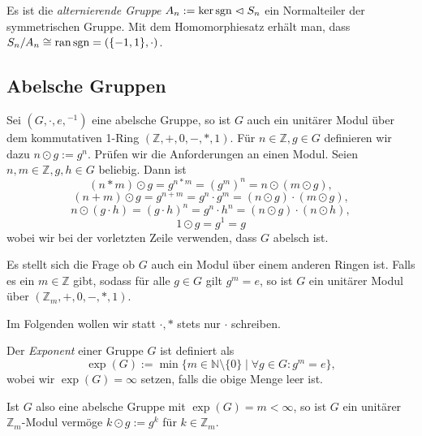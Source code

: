 \begin{remark}
    Es ist die \emph{alternierende Gruppe} $A_n := \ker \operatorname{sgn} \vartriangleleft S_n$ ein Normalteiler der symmetrischen Gruppe. Mit dem Homomorphiesatz erhält man, dass $S_n/A_n \cong \operatorname{ran} \operatorname{sgn} = (\{-1,1\}, \cdot)$.
\end{remark}


\subsection{Abelsche Gruppen}

\begin{remark}
    Sei $(G, \cdot, e, {}^{-1})$ eine abelsche Gruppe, so ist $G$ auch ein unitärer Modul über dem kommutativen 1-Ring $(\mathbb{Z}, +, 0, -, \ast, 1)$. Für $n \in \mathbb{Z}, g \in G$ definieren wir dazu $n \odot g := g^n$. Prüfen wir die Anforderungen an einen Modul. Seien $n, m \in \mathbb{Z}, g, h \in G$ beliebig. Dann ist
    $$ (n \ast m) \odot g = g^{n \ast m} = (g^m)^n = n \odot (m \odot g), $$
    $$ (n+m) \odot g = g^{n+m} = g^n \cdot g^m = (n \odot g) \cdot (m \odot g), $$
    $$ n \odot (g \cdot h) = (g \cdot h)^n = g^n \cdot h^n = (n \odot g) \cdot (n \odot h), $$
    $$1\odot g=g^1=g$$
    wobei wir bei der vorletzten Zeile verwenden, dass $G$ abelsch ist.

    Es stellt sich die Frage ob $G$ auch ein Modul über einem anderen Ringen ist. Falls es ein $m \in \mathbb{Z}$ gibt, sodass für alle $g \in G$ gilt $g^m = e$, so ist $G$ ein unitärer Modul über $(\mathbb{Z}_m, +, 0, -, \ast, 1)$.

    Im Folgenden wollen wir statt $\cdot, \ast$ stets nur $\cdot$ schreiben.
\end{remark}

\begin{definition}
    Der \emph{Exponent} einer Gruppe $G$ ist definiert als
    $$ \exp(G) := \min \{ m \in \mathbb{N} \setminus \{0\} \mid \forall g \in G: g^m = e \}, $$
    wobei wir $\exp(G) = \infty$ setzen, falls die obige Menge leer ist.
\end{definition}

\begin{remark}
    Ist $G$ also eine abelsche Gruppe mit $\exp(G) = m < \infty$, so ist $G$ ein unitärer $\mathbb{Z}_m$-Modul vermöge $k \odot g := g^k$ für $k \in \mathbb{Z}_m$.
\end{remark}

